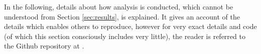 In the following, details about how analysis is conducted, which cannot be understood from Section \ref{sec:results}, is explained. It gives an account of the details which enables others to reproduce, however for very exact details and code (of which this section consciously includes very little), the reader is referred to the Github repository at \cite{projectCode}.